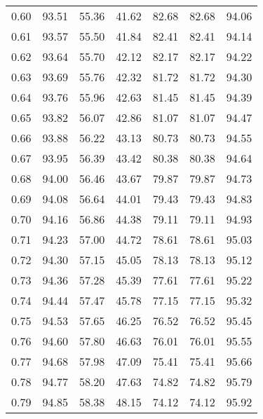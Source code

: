\begin{tabular}{|c|c|c|c|c|c|c|}
      0.60 &     93.51 &     55.36 &      41.62 &   82.68 &      82.68 &         94.06 \\
      0.61 &     93.57 &     55.50 &      41.84 &   82.41 &      82.41 &         94.14 \\
      0.62 &     93.64 &     55.70 &      42.12 &   82.17 &      82.17 &         94.22 \\
      0.63 &     93.69 &     55.76 &      42.32 &   81.72 &      81.72 &         94.30 \\
      0.64 &     93.76 &     55.96 &      42.63 &   81.45 &      81.45 &         94.39 \\
      0.65 &     93.82 &     56.07 &      42.86 &   81.07 &      81.07 &         94.47 \\
      0.66 &     93.88 &     56.22 &      43.13 &   80.73 &      80.73 &         94.55 \\
      0.67 &     93.95 &     56.39 &      43.42 &   80.38 &      80.38 &         94.64 \\
      0.68 &     94.00 &     56.46 &      43.67 &   79.87 &      79.87 &         94.73 \\
      0.69 &     94.08 &     56.64 &      44.01 &   79.43 &      79.43 &         94.83 \\
      0.70 &     94.16 &     56.86 &      44.38 &   79.11 &      79.11 &         94.93 \\
      0.71 &     94.23 &     57.00 &      44.72 &   78.61 &      78.61 &         95.03 \\
      0.72 &     94.30 &     57.15 &      45.05 &   78.13 &      78.13 &         95.12 \\
      0.73 &     94.36 &     57.28 &      45.39 &   77.61 &      77.61 &         95.22 \\
      0.74 &     94.44 &     57.47 &      45.78 &   77.15 &      77.15 &         95.32 \\
      0.75 &     94.53 &     57.65 &      46.25 &   76.52 &      76.52 &         95.45 \\
      0.76 &     94.60 &     57.80 &      46.63 &   76.01 &      76.01 &         95.55 \\
      0.77 &     94.68 &     57.98 &      47.09 &   75.41 &      75.41 &         95.66 \\
      0.78 &     94.77 &     58.20 &      47.63 &   74.82 &      74.82 &         95.79 \\
      0.79 &     94.85 &     58.38 &      48.15 &   74.12 &      74.12 &         95.92 \\

\end{tabular}

